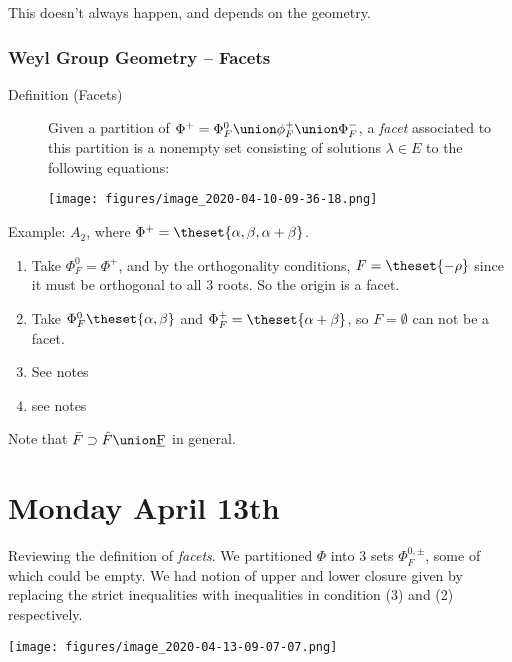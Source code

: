 This doesn't always happen, and depends on the geometry.

\hypertarget{weyl-group-geometry-facets}{%
\subsubsection{Weyl Group Geometry --
Facets}\label{weyl-group-geometry-facets}}

\begin{description}
\item[Definition (Facets)]
Given a partition of
\(\Phi^+ = \Phi^0_F \union \phi^+_F \union \Phi^-_F\), a \emph{facet}
associated to this partition is a nonempty set consisting of solutions
\(\lambda \in E\) to the following equations:

\texttt{[image: figures/image\_2020-04-10-09-36-18.png]}\\
\end{description}

Example: \(A_2\), where
\(\Phi^+ = \theset{\alpha, \beta, \alpha + \beta}\).

\begin{enumerate}
\def\labelenumi{\arabic{enumi}.}
\tightlist
\item
  Take \(\Phi_F^0 = \Phi^+\), and by the orthogonality conditions,
  \(F = \theset{-\rho}\) since it must be orthogonal to all 3 roots. So
  the origin is a facet.
\item
  Take \(\Phi_F^0 \theset{\alpha, \beta}\) and
  \(\Phi_F^+ = \theset{\alpha + \beta}\), so \(F = \emptyset\) can not
  be a facet.
\item
  See notes
\item
  see notes
\end{enumerate}

Note that \(\bar F \supset \hat F \union \underbar F\) in general.

\hypertarget{monday-april-13th}{%
\section{Monday April 13th}\label{monday-april-13th}}

Reviewing the definition of \emph{facets}. We partitioned \(\Phi\) into
3 sets \(\Phi_F^{0, \pm}\), some of which could be empty. We had notion
of upper and lower closure given by replacing the strict inequalities
with inequalities in condition (3) and (2) respectively.

\texttt{[image: figures/image\_2020-04-13-09-07-07.png]}\\

